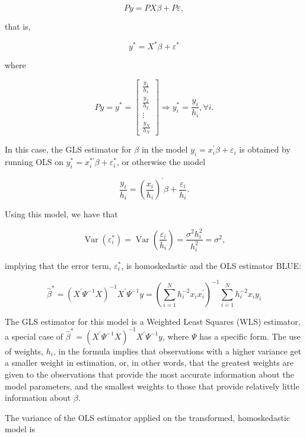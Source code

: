 $$
P y=P X \beta+P \varepsilon,
$$

that is,

$$
y^{*}=X^{*} \beta+\varepsilon^{*}
$$

where

$$
P y=y^{*}=\left[\begin{array}{c}
\frac{y_{1}}{h_{1}} \\
\frac{y_{2}}{h_{2}} \\
\vdots \\
\frac{y_{N}}{h_{N}}
\end{array}\right] \Longrightarrow y_{i}^{*}=\frac{y_{i}}{h_{i}}, \forall i .
$$

In this case, the GLS estimator for $\beta$ in the model $y_{i}=x_{i}^{\prime} \beta+\varepsilon_{i}$ is obtained by running OLS on $y_{i}^{*}=x_{i}^{* \prime} \beta+\varepsilon_{i}^{*}$, or otherwise the model

$$
\frac{y_{i}}{h_{i}}=\left(\frac{x_{i}}{h_{i}}\right)^{\prime} \beta+\frac{\varepsilon_{i}}{h_{i}} .
$$

Using this model, we have that

$$
\operatorname{Var}\left(\varepsilon_{i}^{*}\right)=\operatorname{Var}\left(\frac{\varepsilon_{i}}{h_{i}}\right)=\frac{\sigma^{2} h_{i}^{2}}{h_{i}^{2}}=\sigma^{2},
$$

implying that the error term, $\varepsilon_{i}^{*}$, is homoskedastic and the OLS estimator BLUE:

$$
\widehat{\beta}^{*}=\left(X^{\prime} \Psi^{-1} X\right)^{-1} X^{\prime} \Psi^{-1} y=\left(\sum_{i=1}^{N} h_{i}^{-2} x_{i} x_{i}^{\prime}\right)^{-1} \sum_{i=1}^{N} h_{i}^{-2} x_{i} y_{i}
$$

The GLS estimator for this model is a Weighted Least Squares (WLS) estimator, a special case of $\widehat{\beta}^{*}=\left(X^{\prime} \Psi^{-1} X\right)^{-1} X^{\prime} \Psi^{-1} y$, where $\Psi$ has a specific form. The use of weights, $h_{i}$, in the formula implies that observations with a higher variance get a smaller weight in estimation, or, in other words, that the greatest weights are given to the observations that provide the most accurate information about the model parameters, and the smallest weights to those that provide relatively little information about $\beta$.

The variance of the OLS estimator applied on the transformed, homoskedastic model is


